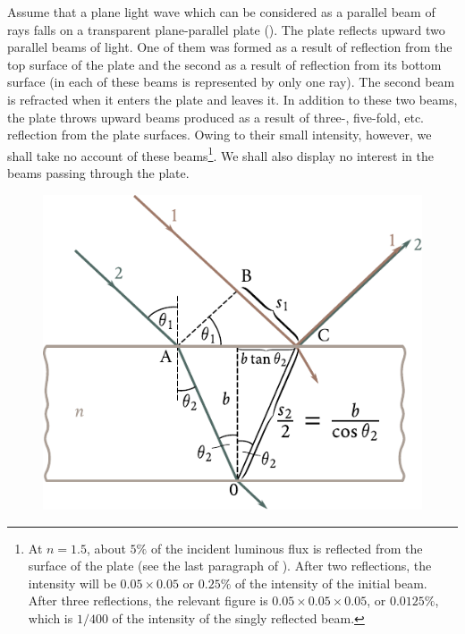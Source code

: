 Assume that a plane light wave which can be considered as a parallel beam of rays falls on a transparent plane-parallel plate ().
The plate reflects upward two parallel beams of light.
One of them was formed as a result of reflection from the top surface of the plate and the second as a result of reflection from its bottom surface (in  each of these beams is  represented by only one ray).
The second beam is refracted when it enters the plate and leaves it.
In addition to these two beams, the plate throws upward beams produced as a result of three-, five-fold, etc. reflection from the plate surfaces.
Owing to their small intensity, however, we shall take no account of these beams\footnote{At $n=1.5$, about $5\%$ of the incident luminous flux is reflected from the surface of the plate (see the last paragraph of ). After two reflections, the intensity will be $0.05\times 0.05$ or $0.25\%$ of the intensity of the initial beam. After three reflections, the relevant figure is $0.05\times 0.05\times 0.05$, or $0.0125\%$, which is $1/400$ of the intensity of the singly reflected beam.}.
We shall also display no interest in the beams passing through the plate.

\begin{figure}[!htb]
	\begin{center}
		\includegraphics[scale=0.95]{figures/ch_17/fig_17_10.pdf}
		\caption[]{}
		\label{fig:17_10}
	\end{center}
	\vspace{-0.8cm}
\end{figure}

